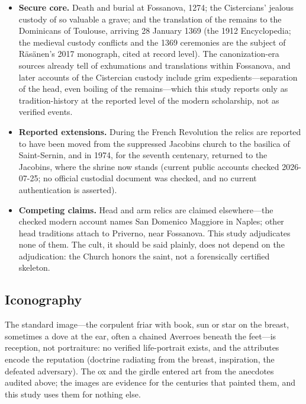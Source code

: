 \begin{itemize}
\item \textbf{Secure core.} Death and burial at Fossanova, 1274; the
Cistercians' jealous custody of so valuable a grave; and the translation
of the remains to the Dominicans of Toulouse, arriving 28 January 1369
(the 1912 Encyclopedia; the medieval custody conflicts and the 1369
ceremonies are the subject of R\"as\"anen's 2017 monograph, cited at
record level). The canonization-era sources already tell of exhumations
and translations within Fossanova, and later accounts of the Cistercian
custody include grim expedients---separation of the head, even boiling
of the remains---which this study reports only as tradition-history at
the reported level of the modern scholarship, not as verified events.
\item \textbf{Reported extensions.} During the French Revolution the
relics are reported to have been moved from the suppressed Jacobins
church to the basilica of Saint-Sernin, and in 1974, for the seventh
centenary, returned to the Jacobins, where the shrine now stands
(current public accounts checked 2026-07-25; no official custodial
document was checked, and no current authentication is asserted).
\item \textbf{Competing claims.} Head and arm relics are claimed
elsewhere---the checked modern account names San Domenico Maggiore in
Naples; other head traditions attach to Priverno, near Fossanova. This
study adjudicates none of them. The cult, it should be said plainly,
does not depend on the adjudication: the Church honors the saint, not a
forensically certified skeleton.
\end{itemize}

\subsection{Iconography}

The standard image---the corpulent friar with book, sun or star on the
breast, sometimes a dove at the ear, often a chained Averroes beneath
the feet---is reception, not portraiture: no verified life-portrait
exists, and the attributes encode the reputation (doctrine radiating
from the breast, inspiration, the defeated adversary). The ox and the
girdle entered art from the anecdotes audited above; the images are
evidence for the centuries that painted them, and this study uses them
for nothing else.
